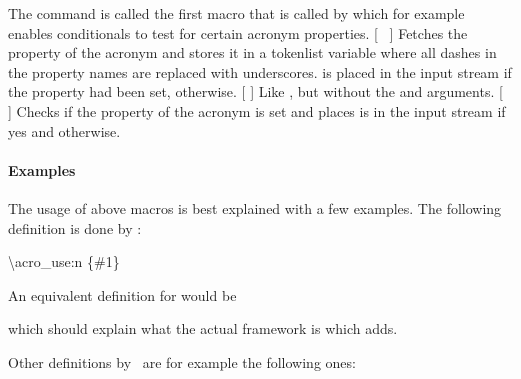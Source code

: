 \documentclass{acro-manual}
\begin{document}
\begin{commands}
    The  command is called the first macro that is called by
     which for example enables conditionals to test for
    certain acronym properties.
  [\TF\   
    ]
    Fetches the property  of the acronym
     and stores it in a tokenlist variable
     where all dashes in the property names
    are replaced with underscores.   is placed in the input stream
    if the property had been set,  otherwise.
  [ ]
    Like \TF, but without the
     and  arguments.
  [\TF\   
    ]
    Checks if the property  of the acronym
     is set and places  is in the input stream if yes and
     otherwise.
\end{commands}

\paragraph{Examples}
The usage of above macros is best explained with a few examples.  The
following definition is done by \acro:
\begin{sourcecode}
  \NewAcroCommand \ac { \acro_use:n {#1} }
\end{sourcecode}
An equivalent definition for  would be
which should explain what the actual framework is which 
adds.

Other definitions by \acro\ are for example the following ones:
\end{document}

